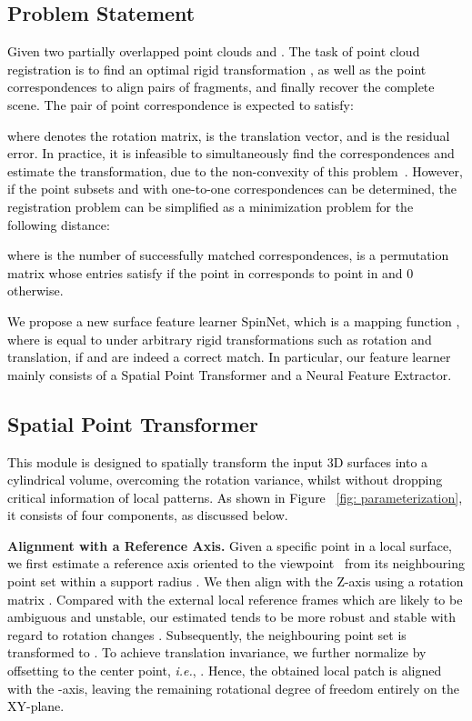 \documentclass[final]{cvpr}
\newcommand{\qy}[1]{\textcolor{black}{#1}}
\newcommand{\bo}[1]{\textcolor{black}{#1}}
\newcommand{\nickname}{SpinNet}
\begin{document}
\subsection{Problem Statement}
\qy{Given two partially overlapped point clouds   and . The task of point cloud registration is to find an optimal rigid transformation , as well as the point correspondences to align pairs of fragments, and finally recover the complete scene. The pair of point correspondence  is expected to satisfy:
}

\qy{where  denotes the rotation matrix,   is the translation vector, and  is the residual error. In practice, it is infeasible to simultaneously find the correspondences and estimate the transformation, due to the non-convexity of this problem~\cite{li20073d}. However, if the point subsets  and  with one-to-one correspondences can be determined, the registration problem can be simplified as a  minimization problem for the following  distance:
} 

\qy{where  is the number of successfully matched correspondences,  
is a permutation matrix whose entries satisfy  if the  point in  corresponds to  point in  and 0 otherwise.}

\qy{We propose a new surface feature learner \nickname{}, which is a mapping function , where  is equal to  under arbitrary rigid transformations such as rotation and translation, if  and  are indeed a correct match. In particular, our feature learner mainly consists of a Spatial Point Transformer and a Neural Feature Extractor.} 

 
\subsection{Spatial Point Transformer}
\label{subsec: FEL}

\bo{This module is designed to spatially transform the input 3D surfaces into a cylindrical volume, overcoming the rotation variance, whilst without dropping critical information of local patterns. As shown in Figure ~\ref{fig: parameterization}, it consists of four components, as discussed below.}

\textbf{Alignment with a Reference Axis.} \qy{Given a specific point  in a local surface, we first estimate a reference axis  oriented to the viewpoint~\cite{mian2010repeatability,ao2020repeatable} from its neighbouring point set  within a support radius . We then align  with the Z-axis using a rotation matrix . Compared with the external local reference frames which are likely to be ambiguous and unstable, our estimated  tends to be more robust and stable with regard to rotation changes \cite{petrelli2011repeatability}.}
\qy{Subsequently, the neighbouring point set  is transformed to .}
\qy{
To achieve translation invariance, we further normalize  by offsetting to the center point, \textit{i.e.}, . Hence, the obtained local patch  is aligned with the -axis, leaving the remaining rotational degree of freedom entirely on the XY-plane.}
\end{document}
